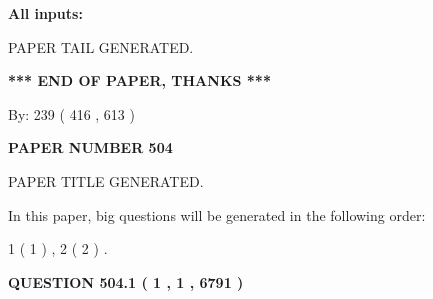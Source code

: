 \documentclass[12pt]{article}
\begin{document}
   
   
   
\noindent{}
   
   
   
   
\noindent\vspace{0.1in}\hspace{-0.08in} {\textbf{\Large{All inputs: }}}
   
   
   
   
   
   
 \vspace{0.2in}
 
   
   
\vspace{2.0in} PAPER TAIL GENERATED.
   
   
   
   
\vspace{1.0in} 
{\textbf{\large{ *** END OF PAPER, THANKS *** }}} 
   
   
\hspace{1.0in} By: 
 239 ( 416 ,  613 )
   
   
   
   
\newpage 
\setcounter{page}{ 
   504001 } 
   
   
   
   
 {\textbf{ \Large{ PAPER NUMBER  504  }}}
   
   
\vspace{0.2in}
   
   
   
   
   
   
   
   
 \vspace{0.2in}
 
 
 
 
   
   
 PAPER TITLE GENERATED.
   
   
   
\vspace{0.2in}
   
In this paper, big questions will be generated in the following order: 
   
   
   1 ( 1 )
 ,
   2 ( 2 )
 .
  
\vspace{0.2in}
  
{\textbf{\Large{QUESTION
504.1 
 ( 1 , 1 , 6791 )
}}}
  
\end{document}
